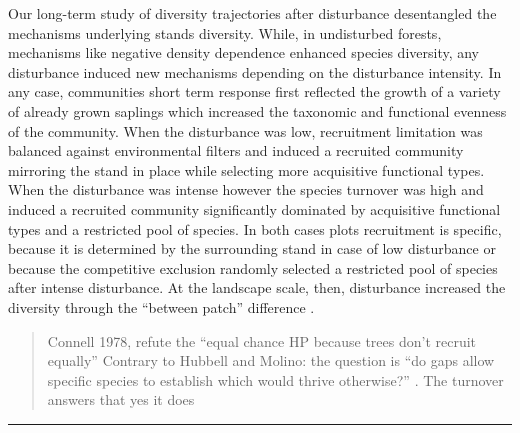 \documentclass[fleqn,10pt]{ArtEcoFoG} %
\begin{document}
Our long-term study of diversity trajectories after disturbance
desentangled the mechanisms underlying stands diversity. While, in
undisturbed forests, mechanisms like negative density dependence
enhanced species diversity, any disturbance induced new mechanisms
depending on the disturbance intensity. In any case, communities short
term response first reflected the growth of a variety of already grown
saplings which increased the taxonomic and functional evenness of the
community. When the disturbance was low, recruitment limitation was
balanced against environmental filters and induced a recruited community
mirroring the stand in place while selecting more acquisitive functional
types. When the disturbance was intense however the species turnover was
high and induced a recruited community significantly dominated by
acquisitive functional types and a restricted pool of species. In both
cases plots recruitment is specific, because it is determined by the
surrounding stand in case of low disturbance or because the competitive
exclusion randomly selected a restricted pool of species after intense
disturbance. At the landscape scale, then, disturbance increased the
diversity through the ``between patch'' difference
\citep{denslow1987, Chesson2000, Sheil2003}.

\begin{quote}
Connell 1978, refute the ``equal chance HP because trees don't recruit
equally'' Contrary to Hubbell and Molino: the question is ``do gaps
allow specific species to establish which would thrive otherwise?''
\citep{Sheil2003}. The turnover answers that yes it does
\end{quote}

\begin{center}\rule{0.5\linewidth}{\linethickness}\end{center}



\makeatletter
{}

\makeatother


\end{document}
